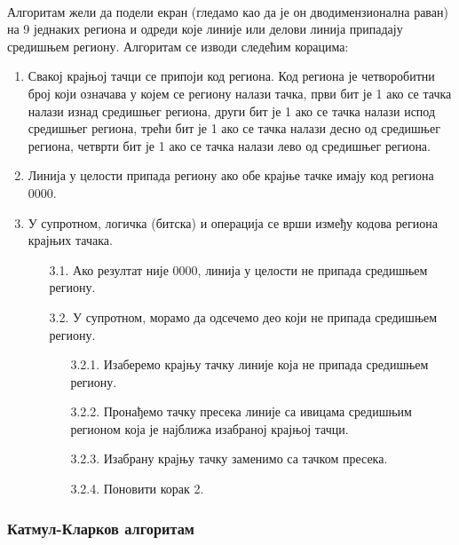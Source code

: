 \documentclass[12pt]{article}
\begin{document}
	\paragraph{}
	Алгоритам жели да подели екран (гледамо као да је он дводимензионална раван) на 9 једнаких региона и одреди које линије или делови линија припадају средишњем региону. Алгоритам се изводи следећим корацима:
	\begin{enumerate}
		\item Свакој крајњој тачци се припоји код региона. Код региона је четворобитни број који означава у којем се региону налази тачка, први бит је 1 ако се тачка налази изнад средишњег региона, други бит је 1 ако се тачка налази испод средишњег региона, трећи бит је 1 ако се тачка налази десно од средишњег региона, четврти бит је 1 ако се тачка налази лево од средишњег региона.
		\item Линија у целости припада региону ако обе крајње тачке имају код региона 0000.
		\item У супротном, логичка (битска) и операција се врши између кодова региона крајњих тачака.
		\begin{enumerate}
			\item[3.1.] Ако резултат није 0000, линија у целости не припада средишњем региону.
			\item[3.2.] У супротном, морамо да одсечемо део који не припада средишњем региону.
			\begin{enumerate}
				\item[3.2.1.] Изаберемо крајњу тачку линије која не припада средишњем региону.
				\item[3.2.2.] Пронађемо тачку пресека линије са ивицама средишњим регионом која је најближа изабраној крајњој тачци.
				\item[3.2.3.] Изабрану крајњу тачку заменимо са тачком пресека.
				\item[3.2.4.] Поновити корак 2.
			\end{enumerate}
		\end{enumerate}
	\end{enumerate}
	
	\subsubsection{Катмул-Кларков алгоритам}\label{katmulklark}
\end{document}
